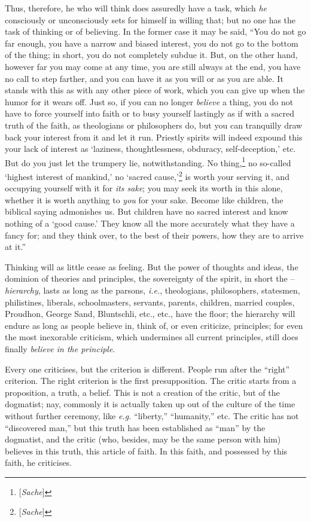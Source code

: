 \documentclass[12pt,a4paper]{book}
\begin{document}
Thus, therefore, he who will think does assuredly have a task, which 
\textit{he} consciously or unconsciously sets for himself in willing that; but 
no one has the task of thinking or of believing. In the former case it may be 
said, ``You do not go far enough, you have a narrow and biased interest, you 
do not go to the bottom of the thing; in short, you do not completely subdue 
it. But, on the other hand, however far you may come at any time, you are 
still always at the end, you have no call to step farther, and you can have it 
as you will or as you are able. It stands with this as with any other piece of 
work, which you can give up when the humor for it wears off. Just so, if you 
can no longer \textit{believe} a thing, you do not have to force yourself into 
faith or to busy yourself lastingly as if with a sacred truth of the faith, as 
theologians or philosophers do, but you can tranquilly draw back your interest 
from it and let it run. Priestly spirits will indeed expound this your lack of 
interest as `laziness, thoughtlessness, obduracy, self-deception,' etc. 
But do you just let the trumpery lie, notwithstanding. No 
thing,\footnote{[\textit{Sache}]} no so-called `highest interest of 
mankind,' no `sacred cause,'\footnote{[\textit{Sache}]} is worth your 
serving it, and occupying yourself with it for \textit{its sake}; you may seek 
its worth in this alone, whether it is worth anything to \textit{you} for your 
sake. Become like children, the biblical saying admonishes us. But children 
have no sacred interest and know nothing of a `good cause.' They know all 
the more accurately what they have a fancy for; and they think over, to the 
best of their powers, how they are to arrive at it.''

Thinking will as little cease as feeling. But the power of thoughts and ideas, 
the dominion of theories and principles, the sovereignty of the spirit, in 
short the -- \textit{hierarchy}, lasts as long as the parsons, \textit{i.e.}, 
theologians, philosophers, statesmen, philistines, liberals, schoolmasters, 
servants, parents, children, married couples, Proudhon, George Sand, 
Bluntschli, etc., etc., have the floor; the hierarchy will endure as long as 
people believe in, think of, or even criticize, principles; for even the most 
inexorable criticism, which undermines all current principles, still does 
finally \textit{believe in the principle}.

Every one criticises, but the criterion is different. People run after the 
``right'' criterion. The right criterion is the first presupposition. The 
critic starts from a proposition, a truth, a belief. This is not a creation of 
the critic, but of the dogmatist; nay, commonly it is actually taken up out of 
the culture of the time without further ceremony, like \textit{e.g.} 
``liberty,'' ``humanity,'' etc. The critic has not ``discovered man,'' 
but this truth has been established as ``man'' by the dogmatist, and the 
critic (who, besides, may be the same person with him) believes in this truth, 
this article of faith. In this faith, and possessed by this faith, he 
criticises.
\end{document}
